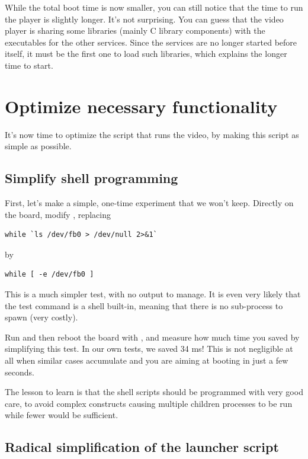 While the total boot time is now smaller, you can still notice
that the time to run the player is slightly longer. It's not surprising.
You can guess that the video player is sharing some libraries (mainly C
library components) with the executables for the other services. Since
the services are no longer started before itself, it must be the first
one to load such libraries, which explains the longer time to start.

\section{Optimize necessary functionality}

It's now time to optimize the  script that runs the video,
by making this script as simple as possible.

\subsection{Simplify shell programming}

First, let's make a simple, one-time experiment that we won't keep.
Directly on the board, modify , replacing

\begin{verbatim}
while `ls /dev/fb0 > /dev/null 2>&1`
\end{verbatim}

by

\begin{verbatim}
while [ -e /dev/fb0 ]
\end{verbatim}

This is a much simpler test, with no output to manage. It is even
very likely that the test command is a shell built-in, meaning that
there is no sub-process to spawn (very costly).

Run  and then reboot the board with ,
and measure how much time you saved by simplifying this test.
In our own tests, we saved 34 ms! This is not negligible at all
when similar cases accumulate and you are aiming at booting in just
a few seconds.

The lesson to learn is that the shell scripts should be programmed
with very good care, to avoid complex constructs causing multiple
children processes to be run while fewer would be sufficient.

\subsection{Radical simplification of the launcher script}

